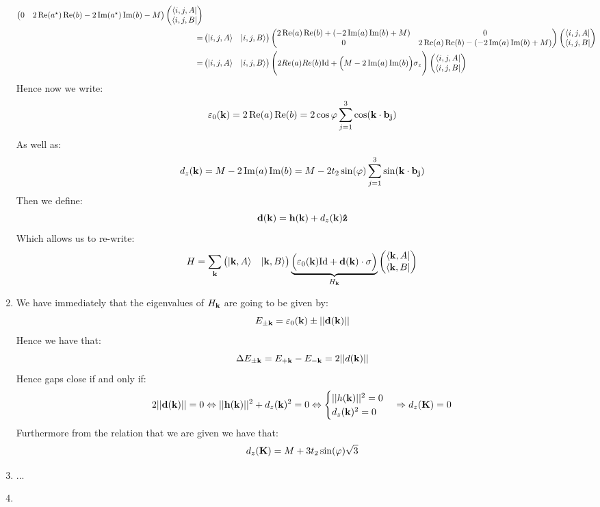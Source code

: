 \documentclass[10pt,a4paper]{article}
\begin{document}
\begin{enumerate}
\begin{align*}
\begin{pmatrix}
0 & 2 \Re(a^\star) \Re(b) - 2 \Im(a^\star) \Im(b) - M
\end{pmatrix}
\begin{pmatrix}
\bra{i, j, A}\\
\bra{i, j, B}
\end{pmatrix}
\\
=
&\begin{pmatrix}
\ket{i, j, A} & \ket{i, j, B}
\end{pmatrix} \begin{pmatrix}
2 \Re(a)\Re(b) + (-2 \Im(a) \Im(b) + M)& 0\\
0 & 2 \Re(a) \Re(b) - (-2 \Im(a) \Im(b) + M) 
\end{pmatrix}
\begin{pmatrix}
\bra{i, j, A}\\
\bra{i, j, B}
\end{pmatrix}
\\
=
&\begin{pmatrix}
\ket{i, j, A} & \ket{i, j, B}
\end{pmatrix} \Bigg(2 Re(a) Re(b) \text{Id} + \Big(M - 2 \Im(a) \Im(b) \Big) \sigma_z \Bigg)
\begin{pmatrix}
\bra{i, j, A}\\
\bra{i, j, B}
\end{pmatrix}
\end{align*}
Hence now we write:
\[
\varepsilon_0(\vb{k}) = 2 \Re(a) \Re(b) = 2 \cos\varphi \sum_{j = 1}^3 \cos(\vb{k} \cdot \vb{b_j})
\]
As well as:
\[
d_z(\vb{k}) = M - 2 \Im(a) \Im(b) = M - 2 t_2 \sin(\varphi) \sum_{j = 1}^3 \sin(\vb{k} \cdot \vb{b_j})
\]
Then we define:
\[
\vb{d}(\vb{k}) = \vb{h}(\vb{k}) + d_z(\vb{k}) \vu{z}
\]
Which allows us to re-write:
\[
H = \sum_{\vb{k}} \begin{pmatrix}
\ket{\vb{k}, A} & \ket{\vb{k}, B}
\end{pmatrix}
\underbrace{\Big( \varepsilon_0(\vb{k}) \text{Id} + \vb{d}(\vb{k}) \cdot \vb{\sigma} \Big)}_{H_{\vb{k}}} \begin{pmatrix}
\bra{\vb{k}, A}\\
\bra{\vb{k}, B}
\end{pmatrix}
\]

\item We have immediately that the eigenvalues of $H_{\vb{k}}$ are going to be given by:
\[
E_{\pm\vb{k}} = \varepsilon_0(\vb{k}) \pm ||\vb{d}(\vb{k})||
\]
Hence we have that:
\[
\Delta E_{\pm \vb{k}} = E_{+\vb{k}} - E_{-\vb{k}} = 2 ||d(\vb{k})||
\]
Hence gaps close if and only if:
\[
2||\vb{d}(\vb{k})|| = 0 \Leftrightarrow ||\vb{h}(\vb{k})||^2 + d_z(\vb{k})^2 = 0 \Leftrightarrow \begin{cases}
||h(\vb{k})||^2 = 0\\
d_z(\vb{k})^2 = 0
\end{cases} \Rightarrow d_z(\vb{K}) = 0
\]
Furthermore from the relation that we are given we have that:
\[
d_z(\vb{K}) = M + 3 t_2 \sin(\varphi)\sqrt{3}
\]

\item ...

\item 

\end{enumerate}
\end{document}
